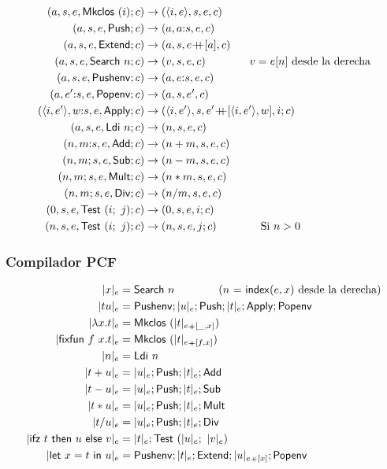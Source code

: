 \documentclass[twoside,a4paper,12pt]{article}
\theoremstyle{definition}
\theoremstyle{remark}
\begin{document}
\begin{align*}
  (a, s, e, \Mkclos i; c)                   & \to (\thunk ie, s, e, c)    \\
  (a, s, e, \Push; c)                       & \to (a, a{\append}s, e, c)  \\
  (a, s, e, \Extend; c)                     & \to (a, s, e\concat [a], c) \\
  (a, s, e, \Search n; c)                   & \to (v, s, e, c)   \qquad\qquad v = e[n] \textrm{ desde la derecha}\\
  (a, s, e, \Pushenv; c)                    & \to (a, e{\append}s, e, c)  \\
  (a, e'{\append}s, e, \Popenv; c)          & \to (a, s, e',c)   \\
  (\thunk i{e'}, w{\append}s, e, \Apply; c) & \to (\thunk i{e'}, s, e'\concat [\thunk i{e'},w], i; c)\\
  (a, s, e, \Ldi n; c)                      & \to (n, s, e, c)    \\
  (n, m{\append}s, e, \Add; c)              & \to (n+m, s, e, c)  \\
  (n, m; s, e, \Sub; c)                     & \to (n-m, s, e, c)  \\
  (n, m; s, e, \Mult; c)                    & \to (n*m, s, e, c)  \\
  (n, m; s, e, \Div; c)                     & \to (n/m, s, e, c)  \\
  (0, s, e, \Test i j; c)                   & \to (0, s, e, i; c) \\
  (n, s, e, \Test i j; c)                   & \to (n, s, e,j; c) \qquad\qquad \textrm{Si }n>0 
\end{align*}

\subsubsection*{Compilador PCF}

\begin{align*}
  |x|_e           &= \Search n \qquad\qquad\textrm{($n$ = \s{index}$(e, x)$ desde la derecha)}\\
  |tu|_e          &= \Pushenv;  |u|_e; \Push;  |t|_e;  \Apply;  \Popenv\\
  |\fun xt|_e     &= \Mkclos {|t|_{e\concats[\_,x]}} \\
  |\fixfun fxt|_e &= \Mkclos {|t|_{e\concats[f,x]}}  \\
  |n|_e           &= \Ldi n \\
  |t+u|_e         &= |u|_e; \Push; |t|_e; \Add\\
  |t-u|_e         &= |u|_e; \Push; |t|_e; \Sub\\
  |t*u|_e         &= |u|_e; \Push; |t|_e; \Mult\\
  |t / u|_e       &= |u|_e; \Push; |t|_e; \Div\\
  |\ifz tuv|_e    &= |t|_e; \Test {|u|_e} {|v|_e}\\
  |\letl xtu|_e   &= \Pushenv;  |t|_e;  \Extend;  |u|_{e\concats [x]};  \Popenv
\end{align*}
\end{document}
